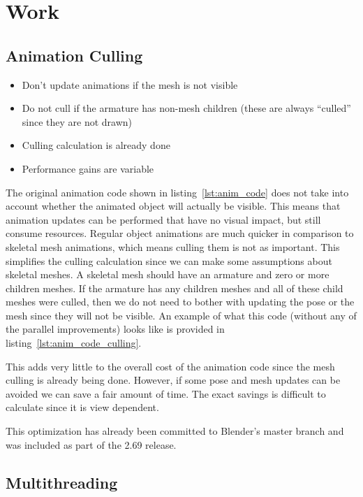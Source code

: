 \section{Work}

\subsection{Animation Culling}
\ifsummaries
\begin{itemize}
 \item Don't update animations if the mesh is not visible
 \item Do not cull if the armature has non-mesh children (these are always ``culled'' since they are not drawn)
 \item Culling calculation is already done
 \item Performance gains are variable
\end{itemize}
\fi

The original animation code shown in listing~\ref{lst:anim_code} does not take into account whether the animated object will actually be visible.
This means that animation updates can be performed that have no visual impact, but still consume resources.
Regular object animations are much quicker in comparison to skeletal mesh animations, which means culling them is not as important.
This simplifies the culling calculation since we can make some assumptions about skeletal meshes.
A skeletal mesh should have an armature and zero or more children meshes.
If the armature has any children meshes and all of these child meshes were culled, then we do not need to bother with updating the pose or the mesh since they will not be visible.
An example of what this code (without any of the parallel improvements) looks like is provided in listing~\ref{lst:anim_code_culling}.


This adds very little to the overall cost of the animation code since the mesh culling is already being done.
However, if some pose and mesh updates can be avoided we can save a fair amount of time.
The exact savings is difficult to calculate since it is view dependent.

This optimization has already been committed to Blender's master branch and was included as part of the 2.69 release.

\subsection{Multithreading}
